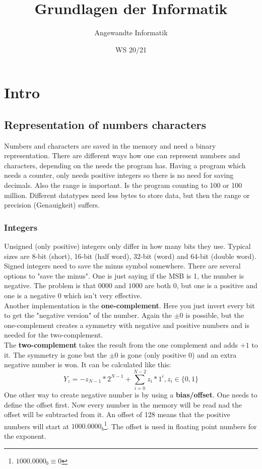 \documentclass[a4paper]{scrartcl}
\author{Angewandte Informatik}
\title{Grundlagen der Informatik}
\date{WS 20/21}
\begin{document}
    \maketitle
    \newpage
    \tableofcontents
    \newpage
    \section{Intro}
        \subsection{Representation of numbers characters}
        Numbers and characters are saved in the memory and need a binary representation. There are different ways how one can represent numbers and characters,
        depending on the needs the program has. Having a program which needs a counter, only needs positive integers so there is no need for saving decimals.  Also the 
        range is important. Is the program counting to 100 or 100 million. Different datatypes need less bytes to store data, but then the range or precision (Genauigkeit) suffers.
        
        \subsubsection*{Integers}
        Unsigned (only positive) integers only differ in how many bits they use. Typical sizes are  8-bit (short), 16-bit (half word), 32-bit (word) and 64-bit (double word). \\
        Signed integers need to save the minus symbol somewhere. There are several options to "save the minus". One is just saying if the MSB is 1, the number is negative. The problem
        is that \(0000\) and \(1000\) are both \(0\), but one is a positive and one is a negative \(0\) which isn't very effective. \\
        Another implementation is the \textbf{one-complement}.
        Here you just invert every bit to get the "negative version" of the number. Again the \(\pm 0\) is possible, but the one-complement 
        creates a symmetry with negative and positive numbers and is needed for the two-complement. \\
        The \textbf{two-complement} takes the result from the one complement and adds \(+1\) to it. The symmetry is gone but the \(\pm 0\) is gone (only positive 0) and an extra negative number is won. It can be calculated like this:
        $$Y_z = -z_{N-1}*2^{N-1} + \sum_{i=0}^{N-2}z_i * 1^i, z_i \in \{0, 1\}$$
        One other way to create negative number is by using a \textbf{bias/offset}. One needs to define the offset first. Now every number in the memory will be read nad the offset will be 
        subtracted from it. An offset of 128 means that the positive numbers will start at \(1000.0000_b \)\footnote{\(1000.0000_b \equiv 0\)}. The offset is used in floating point numbers for the exponent.
\end{document}
